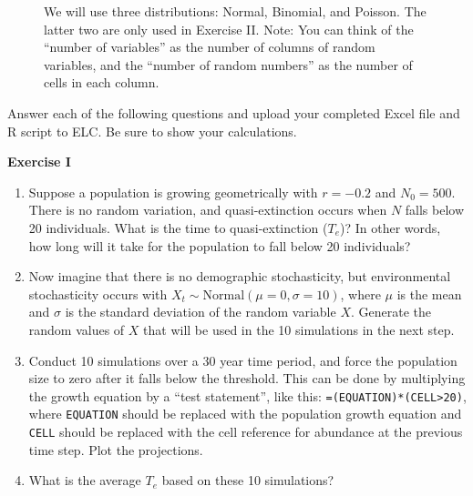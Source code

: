 \documentclass[12pt]{article}\usepackage[]{graphicx}\usepackage[]{color}
\begin{document}
\vspace{1cm}

\begin{figure}[h]
  \centering
  \caption{\footnotesize We will use three distributions: Normal,
    Binomial, and Poisson. The latter two are only used in Exercise
    II. Note: You can think of the ``number of variables'' as the
    number of columns of random variables, and the ``number of random
    numbers'' as the number of cells in each column.
  }
  \label{fig:rng-3}
\end{figure}


\clearpage

Answer each of the following questions and upload your completed Excel
file and R script to ELC. Be sure to show your calculations. \\

\vspace{12pt}

{\bf Exercise I \\}
\begin{enumerate}
  \item Suppose a population is growing geometrically with
    $r=-0.2$ and $N_0=500$. There is no random variation, and
    quasi-extinction occurs when $N$ falls below 20 individuals.
    What is the time to quasi-extinction ($T_e$)? In other words, how
    long will it take for the population to fall below 20 individuals?
  \item Now imagine that there is no demographic stochasticity,
    but environmental stochasticity occurs with $X_t \sim
    \mathrm{Normal}(\mu=0, \sigma=10)$, where $\mu$ is the mean
    and $\sigma$ is the standard deviation of the random variable
    $X$. Generate the random values of $X$ that will be
    used in the 10 simulations in the next step.
  \item Conduct 10 simulations over a 30 year time period, and force
    the population size to zero after it falls below the threshold.
    This can be done by multiplying the
    growth equation by a ``test statement'', like this:
    {\tt =(EQUATION)*(CELL>20)}, where {\tt EQUATION} should be
    replaced with the population growth equation and {\tt CELL} should
    be replaced with the cell reference for abundance at the previous
    time step. Plot the projections.
  \item What is the average $T_e$ based on these 10 simulations?
\end{enumerate}
\end{document}
